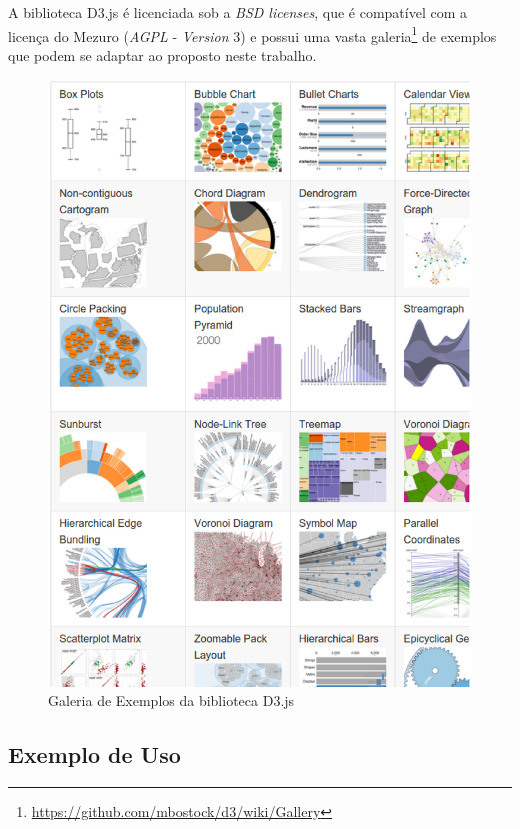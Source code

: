 A biblioteca D3.js é licenciada sob a \textit{BSD licenses}, que é compatível
com a licença do Mezuro (\textit{AGPL} - \textit{Version} 3) e possui uma vasta
galeria\footnote{\url{https://github.com/mbostock/d3/wiki/Gallery}} de exemplos
que podem se adaptar ao proposto neste trabalho.

\begin{figure}[!htb]
	\centering
    \includegraphics[keepaspectratio=true,scale=0.5]
    {figuras/d3_gallery.eps}
  \caption{Galeria de Exemplos da biblioteca D3.js \cite{galleryD3}}
  \label{fig:d3_gallery}
\end{figure}

\subsection{Exemplo de Uso}

